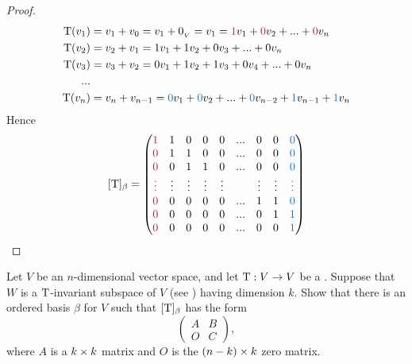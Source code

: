\begin{proof}
\begin{align*}
    \T(v_1) & = v_1 + v_0 = v_1 + \OV = v_1 = \MAROON{1} v_1 + \MAROON{0} v_2 + ... + \MAROON{0} v_n \\
    \T(v_2) & = v_2 + v_1 = 1 v_1 + 1 v_2 + 0 v_3 + ... + 0 v_n \\
    \T(v_3) & = v_3 + v_2 = 0 v_1 + 1 v_2 + 1 v_3 + 0 v_4 + ... + 0 v_n \\
    ... \\
    \T(v_n) & = v_n + v_{n - 1} = \BLUE{0} v_1 + \BLUE{0} v_2 + ... + \BLUE{0} v_{n - 2} + \BLUE{1} v_{n - 1} + \BLUE{1} v_n \\
\end{align*}
Hence
\[
    [\T]_{\beta} = \begin{pmatrix}
        \MAROON{1} & 1 & 0 & 0 & 0 & ... & 0 & 0 & \BLUE{0}\\
        \MAROON{0} & 1 & 1 & 0 & 0 & ... & 0 & 0 & \BLUE{0} \\
        \MAROON{0} & 0 & 1 & 1 & 0 & ... & 0 & 0 & \BLUE{0} \\
        \MAROON{\vdots} & \vdots & \vdots & \vdots & \vdots & & \vdots & \vdots & \BLUE{\vdots} \\
        \MAROON{0} & 0 & 0 & 0 & 0 & ... & 1 & 1 & \BLUE{0} \\
        \MAROON{0} & 0 & 0 & 0 & 0 & ... & 0 & 1 & \BLUE{1} \\
        \MAROON{0} & 0 & 0 & 0 & 0 & ... & 0 & 0 & \BLUE{1}
    \end{pmatrix}
\]
\end{proof}

\begin{exercise} \label{exercise 2.2.11}
Let \(V\) be an \(n\)-dimensional vector space, and let \(\mathrm{T} : V \to V\) be a \LTRAN{}.
Suppose that \(W\) is a \(\mathrm{T}\)-invariant subspace of \(V\) (see ) having dimension \(k\).
Show that there is an ordered basis \(\beta\) for \(V\) such that \([\mathrm{T}]_{\beta}\) has the form
\[
    \begin{pmatrix} A & B \\ O & C \end{pmatrix},
\]
where \(A\) is a \(k \times k\) matrix and \(O\) is the \((n - k) \times k\) zero matrix.
\end{exercise}


